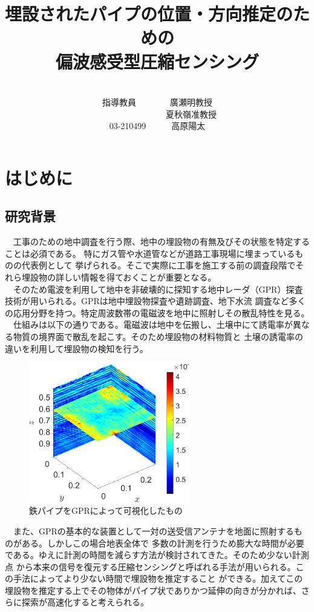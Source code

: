 \documentclass[12pt,a4paper]{jsreport}
\title{埋設されたパイプの位置・方向推定のための\\偏波感受型圧縮センシング}
\author{\\指導教員　　　　廣瀬明教授　\\      　　　　　　　　夏秋嶺准教授\\
03-210499　　　高原陽太
}
\begin{document}
\maketitle
\tableofcontents
\clearpage
\chapter{はじめに}
\section{研究背景}
　工事のための地中調査を行う際、地中の埋設物の有無及びその状態を特定することは必須である。
特にガス管や水道管などが道路工事現場に埋まっているものの代表例として
挙げられる。そこで実際に工事を施工する前の調査段階でそれら埋設物の詳しい情報を得ておくことが重要となる。
\\　そのため電波を利用して地中を非破壊的に探知する地中レーダ（GPR）探査技術が用いられる。GPRは地中埋設物探査や遺跡調査、地下水流
調査など多くの応用分野を持つ\cite{radar1}\cite{radar2}。特定周波数帯の電磁波を地中に照射しその散乱特性を見る。
\\　仕組みは以下の通りである。電磁波は地中を伝搬し、土壌中にて誘電率が異なる物質の境界面で散乱を起こす。そのため埋設物の材料物質と
土壌の誘電率の違いを利用して埋設物の検知を行う。


\begin{figure}[h]
    \begin{center}
     \includegraphics[width=7cm]{./image/0918.png}
     
    \caption{鉄パイプをGPRによって可視化したもの}\label{鉄パイプをGPRによって可視化したもの}
    \end{center}
    \end{figure}

　また、GPRの基本的な装置として一対の送受信アンテナを地面に照射するものがある。しかしこの場合地表全体で
多数の計測を行うため膨大な時間が必要である。ゆえに計測の時間を減らす方法が検討されてきた。そのため少ない計測点
から本来の信号を復元する圧縮センシングと呼ばれる手法が用いられる。この手法によってより少ない時間で埋設物を推定すること
ができる。加えてこの埋設物を推定する上でその物体がパイプ状でありかつ延伸の向きが分かれば、さらに探索が高速化すると考えられる。
\end{document}

